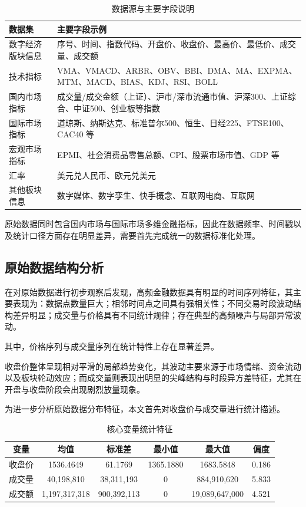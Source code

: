 \documentclass[withoutpreface,bwprint]{cumcmthesis}
\begin{document}
\begin{table}[H]
    \centering
    \caption{数据源与主要字段说明}
    \label{tab:data_sources}
    \begin{tabular}{p{4.2cm}p{10cm}}
        \toprule
        数据集 & 主要字段示例 \\
        \midrule
        数字经济版块信息 & 序号、时间、指数代码、开盘价、收盘价、最高价、最低价、成交量、成交额 \\
        技术指标 & VMA、VMACD、ARBR、OBV、BBI、DMA、MA、EXPMA、MTM、MACD、BIAS、KDJ、RSI、BOLL \\
        国内市场指标 & 成交量/成交金额（上证）、沪市/深市流通市值、沪深300、上证综合、中证500、创业板等指数 \\
        国际市场指标 & 道琼斯、纳斯达克、标准普尔500、恒生、日经225、FTSE100、CAC40 等 \\
        宏观市场指标 & EPMI、社会消费品零售总额、CPI、股票市场市值、GDP 等 \\
        汇率 & 美元兑人民币、欧元兑美元 \\
        其他板块信息 & 数字媒体、数字孪生、快手概念、互联网电商、互联网 \\
        \bottomrule
    \end{tabular}
\end{table}

原始数据同时包含国内市场与国际市场多维金融指标，因此在数据频率、时间戳以及统计口径方面存在明显差异，需要首先完成统一的数据标准化处理。

\subsection{原始数据结构分析}

在对原始数据进行初步观察后发现，高频金融数据具有明显的时间序列特征，其主要表现为：数据点数量巨大；相邻时间点之间具有强相关性；不同交易时段波动结构差异明显；成交量与价格具有不同统计规律；存在典型的高频噪声与局部异常波动。

其中，价格序列与成交量序列在统计特性上存在显著差异。

收盘价整体呈现相对平滑的局部趋势变化，其波动主要来源于市场情绪、资金流动以及板块轮动效应；而成交量则表现出明显的尖峰结构与时段异方差特征，尤其在开盘与收盘阶段会出现剧烈放量现象。

为进一步分析原始数据分布特征，本文首先对收盘价与成交量进行统计描述。

\begin{table}[H]
\centering
\caption{核心变量统计特征}
\begin{tabular}{cccccc}
\toprule
变量 & 均值 & 标准差 & 最小值 & 最大值 & 偏度 \\
\midrule
收盘价 & 1536.4649 & 61.1769 & 1365.1880 & 1683.5848 & 0.186 \\
成交量 & 40,198,810 & 38,311,193 & 0 & 884,910,620 & 5.833 \\
成交额 & 1,197,317,318 & 900,392,113 & 0 & 19,089,647,000 & 4.521 \\
\bottomrule
\end{tabular}
\label{tab:data_stat}
\end{table}
\end{document}
